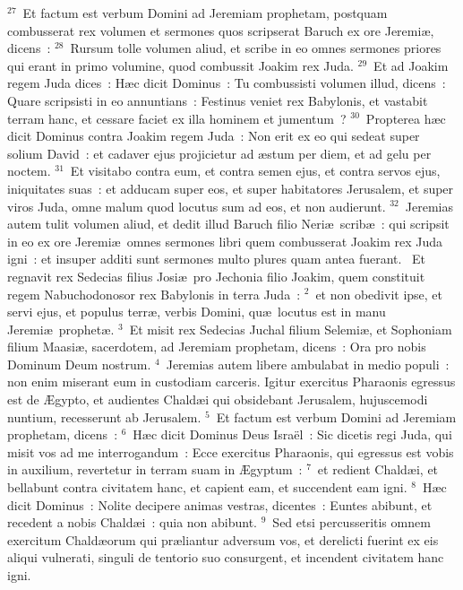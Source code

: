 ${}^{27}$~Et factum est verbum Domini ad Jeremiam prophetam, postquam combusserat rex volumen et sermones quos scripserat Baruch ex ore Jeremi\ae , dicens~:
${}^{28}$~Rursum tolle volumen aliud, et scribe in eo omnes sermones priores qui erant in primo volumine, quod combussit Joakim rex Juda.
${}^{29}$~Et ad Joakim regem Juda dices~: H\ae c dicit Dominus~: Tu combussisti volumen illud, dicens~: Quare scripsisti in eo annuntians~: Festinus veniet rex Babylonis, et vastabit terram hanc, et cessare faciet ex illa hominem et jumentum~?
${}^{30}$~Propterea h\ae c dicit Dominus contra Joakim regem Juda~: Non erit ex eo qui sedeat super solium David~: et cadaver ejus projicietur ad \ae stum per diem, et ad gelu per noctem.
${}^{31}$~Et visitabo contra eum, et contra semen ejus, et contra servos ejus, iniquitates suas~: et adducam super eos, et super habitatores Jerusalem, et super viros Juda, omne malum quod locutus sum ad eos, et non audierunt.
${}^{32}$~Jeremias autem tulit volumen aliud, et dedit illud Baruch filio Neri\ae\ scrib\ae~: qui scripsit in eo ex ore Jeremi\ae\ omnes sermones libri quem combusserat Joakim rex Juda igni~: et insuper additi sunt sermones multo plures quam antea fuerant.
~\lettrine[lines=10,image=true,loversize=0.05,lraise=-0.03]{E}{}t regnavit rex Sedecias filius Josi\ae\ pro Jechonia filio Joakim, quem constituit regem Nabuchodonosor rex Babylonis in terra Juda~:
${}^{2}$~et non obedivit ipse, et servi ejus, et populus terr\ae , verbis Domini, qu\ae\ locutus est in manu Jeremi\ae\ prophet\ae .
${}^{3}$~Et misit rex Sedecias Juchal filium Selemi\ae , et Sophoniam filium Maasi\ae , sacerdotem, ad Jeremiam prophetam, dicens~: Ora pro nobis Dominum Deum nostrum.
${}^{4}$~Jeremias autem libere ambulabat in medio populi~: non enim miserant eum in custodiam carceris. Igitur exercitus Pharaonis egressus est de \AE gypto, et audientes Chald\ae i qui obsidebant Jerusalem, hujuscemodi nuntium, recesserunt ab Jerusalem.
${}^{5}$~Et factum est verbum Domini ad Jeremiam prophetam, dicens~:
${}^{6}$~H\ae c dicit Dominus Deus Isra\"el~: Sic dicetis regi Juda, qui misit vos ad me interrogandum~: Ecce exercitus Pharaonis, qui egressus est vobis in auxilium, revertetur in terram suam in \AE gyptum~:
${}^{7}$~et redient Chald\ae i, et bellabunt contra civitatem hanc, et capient eam, et succendent eam igni.
${}^{8}$~H\ae c dicit Dominus~: Nolite decipere animas vestras, dicentes~: Euntes abibunt, et recedent a nobis Chald\ae i~: quia non abibunt.
${}^{9}$~Sed etsi percusseritis omnem exercitum Chald\ae orum qui pr\ae liantur adversum vos, et derelicti fuerint ex eis aliqui vulnerati, singuli de tentorio suo consurgent, et incendent civitatem hanc igni.
